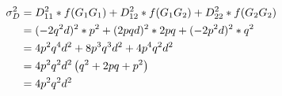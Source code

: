 \documentclass[]{book}
\theoremstyle{definition}
\theoremstyle{definition}
\theoremstyle{definition}
\theoremstyle{remark}
\begin{document}
\begin{align}
\sigma_D^2  &=  D_{11}^2 * f(G_1G_1) + D_{12}^2 * f(G_1G_2) + D_{22}^2 * f(G_2G_2) \notag \\
            &=   (- 2q^2d)^2 * p^2 + (2pqd)^2 * 2pq + (- 2p^2d)^2 * q^2 \notag \\
            &=  4p^2q^4d^2 + 8p^3q^3d^2 + 4p^4q^2d^2 \notag \\
            &=  4p^2q^2d^2 \left( q^2 + 2pq + p^2 \right) \notag \\
            &=  4p^2q^2d^2 
\label{eq:VarDom}
\end{align}


\end{document}
